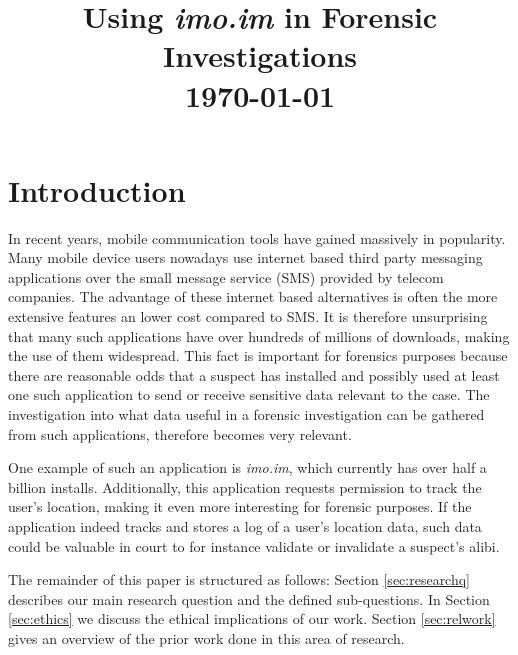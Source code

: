 \documentclass[conference]{IEEEtran}
\begin{document}
\title{Using {\it imo.im} in Forensic Investigations \\\vspace{5mm} \large  \today}
\author{
\and
{}
}
\maketitle
\thispagestyle{plain}
\pagestyle{plain}


\section{Introduction}

In recent years, mobile communication tools have gained massively in popularity.
Many mobile device users nowadays use internet based third party messaging
applications over the small message service (SMS) provided by telecom companies.
The advantage of these internet based alternatives is often the more extensive
features an lower cost compared to SMS. It is therefore unsurprising that many
such applications have over hundreds of millions of downloads, making the use of
them widespread. This fact is important for forensics purposes because there are
reasonable odds that a suspect has installed and possibly used at least one such
application to send or receive sensitive data relevant to the case. The
investigation into what data useful in a forensic investigation can be gathered
from such applications, therefore becomes very relevant.

One example of such an application is {\it imo.im}, which currently  has over
half a billion installs. Additionally, this application requests permission to
track the user's location, making it even more interesting for forensic
purposes. If the application indeed tracks and stores a log of a user's location
data, such data could be valuable in court to for instance validate or
invalidate a suspect's alibi.

The remainder of this paper is structured as follows: Section
\ref{sec:researchq} describes our main research question and the defined
sub-questions. In Section \ref{sec:ethics} we discuss the ethical implications
of our work. Section \ref{sec:relwork} gives an overview of the prior work done
in this area of research. %
\end{document}

